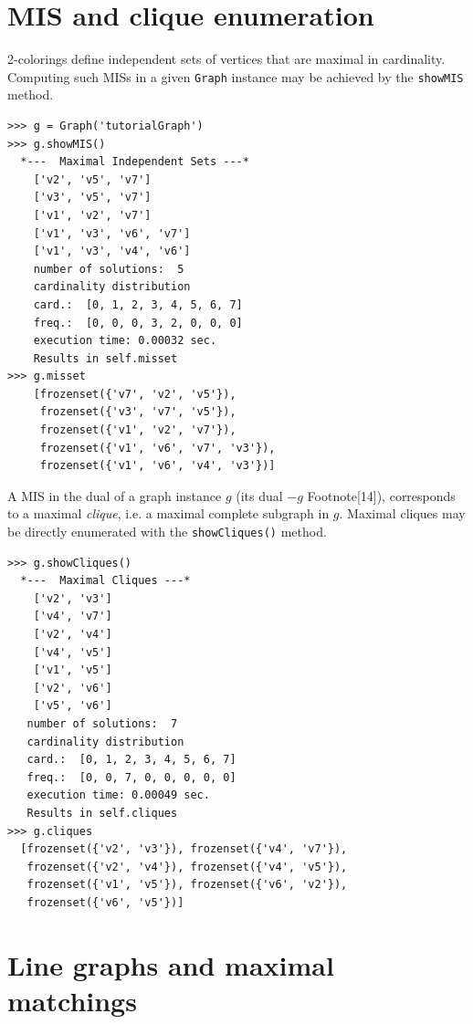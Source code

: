 \section{MIS and clique enumeration}
\label{sec:22.3}

2-colorings define independent sets of vertices that are maximal in cardinality. Computing such MISs in a given \texttt{Graph} instance may be achieved by the \texttt{showMIS} method.
\begin{lstlisting}
>>> g = Graph('tutorialGraph')
>>> g.showMIS()
  *---  Maximal Independent Sets ---*
    ['v2', 'v5', 'v7']
    ['v3', 'v5', 'v7']
    ['v1', 'v2', 'v7']
    ['v1', 'v3', 'v6', 'v7']
    ['v1', 'v3', 'v4', 'v6']
    number of solutions:  5
    cardinality distribution
    card.:  [0, 1, 2, 3, 4, 5, 6, 7]
    freq.:  [0, 0, 0, 3, 2, 0, 0, 0]
    execution time: 0.00032 sec.
    Results in self.misset
>>> g.misset
    [frozenset({'v7', 'v2', 'v5'}), 
     frozenset({'v3', 'v7', 'v5'}), 
     frozenset({'v1', 'v2', 'v7'}), 
     frozenset({'v1', 'v6', 'v7', 'v3'}), 
     frozenset({'v1', 'v6', 'v4', 'v3'})]
\end{lstlisting}

A MIS in the dual of a graph instance $g$ (its dual $-g$ Footnote[14]), corresponds to a maximal \emph{clique}, i.e. a maximal complete subgraph in $g$. Maximal cliques may be directly enumerated with the \texttt{showCliques()} method.
\begin{lstlisting}
>>> g.showCliques()
  *---  Maximal Cliques ---*
    ['v2', 'v3']
    ['v4', 'v7']
    ['v2', 'v4']
    ['v4', 'v5']
    ['v1', 'v5']
    ['v2', 'v6']
    ['v5', 'v6']
   number of solutions:  7
   cardinality distribution
   card.:  [0, 1, 2, 3, 4, 5, 6, 7]
   freq.:  [0, 0, 7, 0, 0, 0, 0, 0]
   execution time: 0.00049 sec.
   Results in self.cliques
>>> g.cliques
  [frozenset({'v2', 'v3'}), frozenset({'v4', 'v7'}), 
   frozenset({'v2', 'v4'}), frozenset({'v4', 'v5'}), 
   frozenset({'v1', 'v5'}), frozenset({'v6', 'v2'}), 
   frozenset({'v6', 'v5'})]
\end{lstlisting}

\section{Line graphs and maximal matchings}
\label{sec:22.4}

